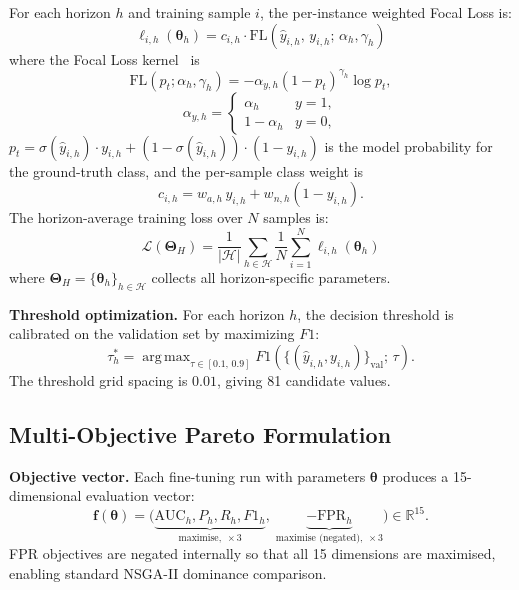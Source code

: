 ﻿\documentclass[twocolumn]{article}
\DeclareMathOperator*{\argmax}{arg\,max}
\begin{document}
For each horizon $h$ and training sample $i$, the per-instance
weighted Focal Loss is:
\begin{equation}
  \ell_{i,h}(\boldsymbol{\theta}_h)
  = c_{i,h}\cdot
    \mathrm{FL}\!\left(\hat{y}_{i,h},\, y_{i,h};\, \alpha_h, \gamma_h\right)
  \label{eq:instance_loss}
\end{equation}
where the Focal Loss kernel~\cite{lin2017focal} is
\begin{equation}
  \mathrm{FL}(p_t;\alpha_h,\gamma_h)
  = -\alpha_{y,h}(1-p_t)^{\gamma_h}\log p_t,
  \label{eq:focal_kernel}
\end{equation}
\begin{equation}
  \alpha_{y,h} = \begin{cases}
    \alpha_h   & y{=}1,\\
    1-\alpha_h & y{=}0,
  \end{cases}
  \label{eq:fl_kernel}
\end{equation}
$p_t = \sigma(\hat{y}_{i,h})\cdot y_{i,h}
       + (1-\sigma(\hat{y}_{i,h}))\cdot(1-y_{i,h})$
is the model probability for the ground-truth class,
and the per-sample class weight is
\begin{equation}
  c_{i,h} = w_{a,h}\,y_{i,h} + w_{n,h}(1-y_{i,h}).
  \label{eq:classweight}
\end{equation}
The horizon-average training loss over $N$ samples is:
\begin{equation}
  \mathcal{L}(\boldsymbol{\Theta}_H)
  = \frac{1}{|\mathcal{H}|}\sum_{h\in\mathcal{H}}
    \frac{1}{N}\sum_{i=1}^{N}\ell_{i,h}(\boldsymbol{\theta}_h)
  \label{eq:total_loss}
\end{equation}
where $\boldsymbol{\Theta}_H = \{\boldsymbol{\theta}_h\}_{h\in\mathcal{H}}$
collects all horizon-specific parameters.

\textbf{Threshold optimization.}
For each horizon $h$, the decision threshold is calibrated on the
validation set by maximizing $F1$:
\begin{equation}
  \tau_h^* = \argmax_{\tau\in[0.1,\,0.9]}
    F1\!\left(\{(\hat{y}_{i,h},y_{i,h})\}_{\text{val}};\,\tau\right).
  \label{eq:threshold}
\end{equation}
The threshold grid spacing is $0.01$, giving 81 candidate values.

\subsection{Multi-Objective Pareto Formulation}

\textbf{Objective vector.}
Each fine-tuning run with parameters $\boldsymbol{\theta}$
produces a 15-dimensional evaluation vector:
\begin{equation}
  \mathbf{f}(\boldsymbol{\theta}) =
  \bigl(
    \underbrace{\mathrm{AUC}_h, P_h, R_h, F1_h}_{\text{maximise},\;\times 3},\;
    \underbrace{-\mathrm{FPR}_h}_{\text{maximise (negated)},\;\times 3}
  \bigr)
  \in \mathbb{R}^{15}.
  \label{eq:objectives}
\end{equation}
FPR objectives are negated internally so that all 15 dimensions are
maximised, enabling standard NSGA-II dominance comparison.
\end{document}
